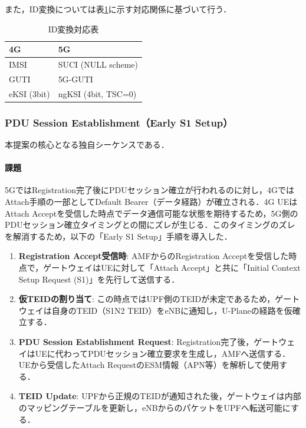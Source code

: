 また，ID変換については表\ref{tab:id_conversion}に示す対応関係に基づいて行う．

\begin{table}[htbp]
\centering
\caption{ID変換対応表}
\label{tab:id_conversion}
\begin{tabular}{|l|l|}
\hline
\textbf{4G} & \textbf{5G} \\
\hline
IMSI & SUCI (NULL scheme) \\
\hline
GUTI & 5G-GUTI \\
\hline
eKSI (3bit) & ngKSI (4bit, TSC=0) \\
\hline
\end{tabular}
\end{table}

\subsubsection{PDU Session Establishment（Early S1 Setup）}
\label{sec:pdu_session_establishment}
本提案の核心となる独自シーケンスである．

\paragraph{課題}
5GではRegistration完了後にPDUセッション確立が行われるのに対し，4GではAttach手順の一部としてDefault Bearer（データ経路）が確立される．4G UEはAttach Acceptを受信した時点でデータ通信可能な状態を期待するため，5G側のPDUセッション確立タイミングとの間にズレが生じる．このタイミングのズレを解消するため，以下の「Early S1 Setup」手順を導入した．

\begin{enumerate}
	\item \textbf{Registration Accept受信時}: AMFからのRegistration Acceptを受信した時点で，ゲートウェイはUEに対して「Attach Accept」と共に「Initial Context Setup Request (S1)」を先行して送信する．
	\item \textbf{仮TEIDの割り当て}: この時点ではUPF側のTEIDが未定であるため，ゲートウェイは自身のTEID（S1N2 TEID）をeNBに通知し，U-Planeの経路を仮確立する．
	\item \textbf{PDU Session Establishment Request}: Registration完了後，ゲートウェイはUEに代わってPDUセッション確立要求を生成し，AMFへ送信する．UEから受信したAttach RequestのESM情報（APN等）を解析して使用する．
	\item \textbf{TEID Update}: UPFから正規のTEIDが通知された後，ゲートウェイは内部のマッピングテーブルを更新し，eNBからのパケットをUPFへ転送可能にする．
\end{enumerate}

